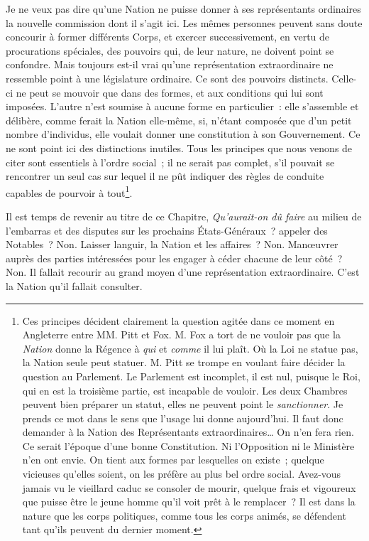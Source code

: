 \documentclass[french,twoside]{book} %
\begin{document}
Je ne veux pas dire qu’une Nation ne puisse donner à ses représentants ordinaires la nouvelle commission dont il s’agit ici. Les mêmes personnes peuvent sans doute concourir à former différents Corps, et exercer successivement, en vertu de procurations spéciales, des pouvoirs qui, de leur nature, ne doivent point se confondre. Mais toujours est-il vrai qu’une représentation extraordinaire ne ressemble point à une législature ordinaire. Ce sont des pouvoirs distincts. Celle-ci ne peut se mouvoir que dans des formes, et aux conditions qui lui sont imposées. L’autre n’est soumise à aucune forme en particulier : elle s’assemble et délibère, comme ferait la Nation elle-même, si, n’étant composée que d’un petit nombre d’individus, elle voulait donner une constitution à son Gouvernement. Ce ne sont point ici des distinctions inutiles. Tous les principes que nous venons de citer sont essentiels à l’ordre social ; il ne serait pas complet, s’il pouvait se rencontrer un seul cas sur lequel il ne pût indiquer des règles de conduite capables de pourvoir à tout\footnote{Ces principes décident clairement la question agitée dans ce moment en Angleterre entre MM. Pitt et Fox. M. Fox a tort de ne vouloir pas que la {\itshape Nation} donne la Régence à {\itshape qui} et {\itshape comme} il lui plaît. Où la Loi ne statue pas, la Nation seule peut statuer. M. Pitt se trompe en voulant faire décider la question au Parlement. Le Parlement est incomplet, il est nul, puisque le Roi, qui en est la troisième partie, est incapable de vouloir. Les deux Chambres peuvent bien préparer un statut, elles ne peuvent point le {\itshape sanctionner}. Je prends ce mot dans le sens que l’usage lui donne aujourd’hui. Il faut donc demander à la Nation des Représentants extraordinaires… On n’en fera rien. Ce serait l’époque d’une bonne Constitution. Ni l’Opposition ni le Ministère n’en ont envie. On tient aux formes par lesquelles on existe ; quelque vicieuses qu’elles soient, on les préfère au plus bel ordre social. Avez-vous jamais vu le vieillard caduc se consoler de mourir, quelque frais et vigoureux que puisse être le jeune homme qu’il voit prêt à le remplacer ? Il est dans la nature que les corps politiques, comme tous les corps animés, se défendent tant qu’ils peuvent du dernier moment.}.\par
Il est temps de revenir au titre de ce Chapitre, {\itshape Qu’aurait-on dû faire} au milieu de l’embarras et des disputes sur les prochains États-Généraux ? appeler des Notables ? Non. Laisser languir, la Nation et les affaires ? Non. Manœuvrer auprès des parties intéressées pour les engager à céder chacune de leur côté ? Non. Il fallait recourir au grand moyen d’une représentation extraordinaire. C’est la Nation qu’il fallait consulter.\par
\end{document}
